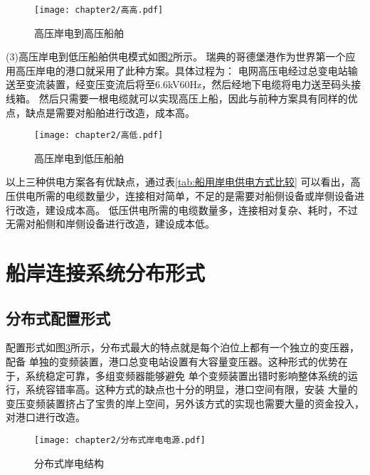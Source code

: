 \begin{figure}[!htp]
	\centering
	\texttt{[image: chapter2/高高.pdf]}
	\caption{高压岸电到高压船舶}
	\label{fig:高高}
\end{figure}

(3)高压岸电到低压船舶供电模式如图\ref{fig:高低}所示。
瑞典的哥德堡港作为世界第一个应用高压岸电的港口就采用了此种方案。具体过程为：
电网高压电经过总变电站输送至变流装置，经变压变流后将至6.6kV60Hz，然后经地下电缆将电力送至码头接线箱。
然后只需要一根电缆就可以实现高压上船，因此与前种方案具有同样的优点，缺点是需要对船舶进行改造，成本高。

\begin{figure}[!htp]
	\centering
	\texttt{[image: chapter2/高低.pdf]}
	\caption{高压岸电到低压船舶}
	\label{fig:高低}
\end{figure}

以上三种供电方案各有优缺点，通过表\ref{tab:船用岸电供电方式比较}
可以看出，高压供电所需的电缆数量少，连接相对简单，不足的是需要对船侧设备或岸侧设备进行改造，建设成本高。
低压供电所需的电缆数量多，连接相对复杂、耗时，不过无需对船侧和岸侧设备进行改造，建设成本低。

\begin{table}[!htp]
	\centering
	\caption[船用岸电供电方式比较]{船用岸电供电方式比较}
	\label{tab:船用岸电供电方式比较}
\end{table}

\section{船岸连接系统分布形式}

\subsection{分布式配置形式}

配置形式如图\ref{fig:分布式岸电结构}所示，分布式最大的特点就是每个泊位上都有一个独立的变压器，配备
单独的变频装置，港口总变电站设置有大容量变压器。这种形式的优势在于，系统稳定可靠，多组变频器能够避免
单个变频装置出错时影响整体系统的运行，系统容错率高。这种方式的缺点也十分的明显，港口空间有限，安装
大量的变压变频装置挤占了宝贵的岸上空间，另外该方式的实现也需要大量的资金投入，对港口进行改造。

\begin{figure}[!htp]
	\centering
	\texttt{[image: chapter2/分布式岸电电源.pdf]}
	\caption{分布式岸电结构}
	\label{fig:分布式岸电结构}
\end{figure}

